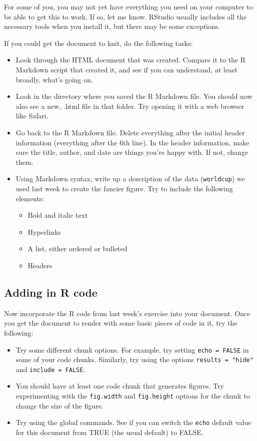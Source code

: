 \documentclass[]{book}
\providecommand{\tightlist}{%
  \setlength{\itemsep}{0pt}\setlength{\parskip}{0pt}}
\theoremstyle{definition}
\theoremstyle{definition}
\theoremstyle{definition}
\theoremstyle{remark}
\begin{document}
For some of you, you may not yet have everything you need on your
computer to be able to get this to work. If so, let me know. RStudio
usually includes all the necessary tools when you install it, but there
may be some exceptions.

If you could get the document to knit, do the following tasks:

\begin{itemize}
\tightlist
\item
  Look through the HTML document that was created. Compare it to the R
  Markdown script that created it, and see if you can understand, at
  least broadly, what's going on.
\item
  Look in the directory where you saved the R Markdown file. You should
  now also see a new, .html file in that folder. Try opening it with a
  web browser like Safari.
\item
  Go back to the R Markdown file. Delete everything after the initial
  header information (everything after the 6th line). In the header
  information, make sure the title, author, and date are things you're
  happy with. If not, change them.
\item
  Using Markdown syntax, write up a description of the data
  (\texttt{worldcup}) we used last week to create the fancier figure.
  Try to include the following elements:

  \begin{itemize}
  \tightlist
  \item
    Bold and italic text
  \item
    Hyperlinks
  \item
    A list, either ordered or bulleted
  \item
    Headers
  \end{itemize}
\end{itemize}

\subsection{Adding in R code}\label{adding-in-r-code}

Now incorporate the R code from last week's exercise into your document.
Once you get the document to render with some basic pieces of code in
it, try the following:

\begin{itemize}
\tightlist
\item
  Try some different chunk options. For example, try setting
  \texttt{echo\ =\ FALSE} in some of your code chunks. Similarly, try
  using the options \texttt{results\ =\ "hide"} and
  \texttt{include\ =\ FALSE}.
\item
  You should have at least one code chunk that generates figures. Try
  experimenting with the \texttt{fig.width} and \texttt{fig.height}
  options for the chunk to change the size of the figure.
\item
  Try using the global commands. See if you can switch the \texttt{echo}
  default value for this document from TRUE (the usual default) to
  FALSE.
\end{itemize}
\end{document}
